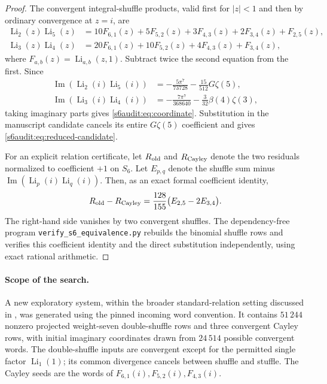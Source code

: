 \documentclass[11pt,a4paper]{article}
\numberwithin{equation}{section}
\theoremstyle{plain}
\theoremstyle{definition}
\theoremstyle{remark}
\begin{document}
\begin{proof}
The convergent integral-shuffle products, valid first for $|z|<1$ and
then by ordinary convergence at $z=i$, are
\begin{align*}
 \operatorname{Li}_2(z)\operatorname{Li}_5(z)
 &=10F_{6,1}(z)+5F_{5,2}(z)+3F_{4,3}(z)
   +2F_{3,4}(z)+F_{2,5}(z),\\
 \operatorname{Li}_3(z)\operatorname{Li}_4(z)
 &=20F_{6,1}(z)+10F_{5,2}(z)+4F_{4,3}(z)+F_{3,4}(z),
\end{align*}
where $F_{a,b}(z)=\operatorname{Li}_{a,b}(z,1)$.
Subtract twice the second equation from the first. Since
\begin{align*}
 \operatorname{Im}(\operatorname{Li}_2(i)\operatorname{Li}_5(i))
 &=-\frac{5\pi^7}{73728}-\frac{15}{512}G\zeta(5),\\
 \operatorname{Im}(\operatorname{Li}_3(i)\operatorname{Li}_4(i))
 &=-\frac{7\pi^7}{368640}-\frac3{32}\beta(4)\zeta(3),
\end{align*}
taking imaginary parts gives \eqref{s6audit:eq:coordinate}.
Substitution in the manuscript candidate cancels its entire
$G\zeta(5)$ coefficient and gives \eqref{s6audit:eq:reduced-candidate}.

For an explicit relation certificate, let $R_{\rm old}$ and
$R_{\rm Cayley}$ denote the two residuals normalized to coefficient
$+1$ on $S_6$. Let $E_{p,q}$ denote the shuffle sum minus
$\operatorname{Im}(\operatorname{Li}_p(i)\operatorname{Li}_q(i))$.
Then, as an exact formal coefficient identity,
\[
 R_{\rm old}-R_{\rm Cayley}
 =\frac{128}{155}\bigl(E_{2,5}-2E_{3,4}\bigr).
\]
The right-hand side vanishes by two convergent shuffles. The
dependency-free program \texttt{verify\_s6\_equivalence.py} rebuilds the
binomial shuffle rows and verifies this coefficient identity and the
direct substitution independently, using exact rational arithmetic.
\end{proof}

\paragraph{Scope of the search.}
A new exploratory system, within the broader standard-relation
setting discussed in \cite{cont:Zhao}, was generated using the pinned incoming
word convention. It contains $51\,244$ nonzero projected weight-seven
double-shuffle rows and three convergent Cayley rows, with initial
imaginary coordinates drawn from $24\,514$ possible convergent words.
The double-shuffle inputs are convergent except for the permitted single
factor $\operatorname{Li}_1(1)$; its common divergence cancels between
shuffle and stuffle. The Cayley seeds are the words of
$F_{6,1}(i),F_{5,2}(i),F_{4,3}(i)$.
\end{document}
